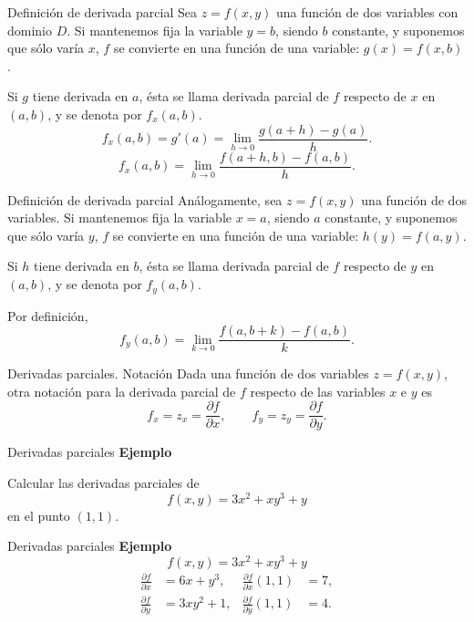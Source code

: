 \documentclass[original_version/main.tex]{subfiles}
\begin{document}
\graphicspath{{imagenes/tema3/}{../imagenes/tema3/}}

\begin{frame}{Definición de derivada parcial}
Sea $z=f(x,y)$ una función de dos variables con dominio $D$. Si mantenemos fija la variable $y=b$, siendo $b$ constante, y suponemos que sólo varía $x$, $f$ se convierte en una función de una variable: $g(x)=f(x,b)$.
\medskip

Si $g$ tiene derivada en $a$, ésta se llama derivada parcial de $f$ respecto de $x$ en $(a,b)$, y se denota por $f_x(a,b)$.
\[f_x(a,b)=g'(a)=\lim_{h\to0}\frac{g(a+h)-g(a)}h.\]
\[f_x(a,b)=\lim_{h\to0}\frac{f(a+h,b)-f(a,b)}h.\]
\end{frame}
\begin{frame}{Definición de derivada parcial}
Análogamente, sea $z=f(x,y)$ una función de dos variables. Si mantenemos fija la variable $x=a$, siendo $a$ constante, y suponemos que sólo varía $y$, $f$ se convierte en una función de una variable: $h(y)=f(a,y)$.
\medskip

Si $h$ tiene derivada en $b$, ésta se llama derivada parcial de $f$ respecto de $y$ en $(a,b)$, y se denota por $f_y(a,b)$.
\medskip

Por definición,
\[f_y(a,b)=\lim_{k\to0}\frac{f(a,b+k)-f(a,b)}k.\]
\end{frame}
\begin{frame}{Derivadas parciales. Notación}
Dada una función de dos variables $z=f(x,y)$, otra notación para la derivada parcial de $f$ respecto de las variables $x$ e $y$ es
\[f_x=z_x=\frac{\partial f}{\partial x},\qquad f_y=z_y=\frac{\partial f}{\partial y}.\]
\end{frame}
\begin{frame}{Derivadas parciales}
\textbf{Ejemplo}\par Calcular las derivadas parciales de\[f(x,y)=3x^2+xy^3+y\]
en el punto $(1,1)$.
\end{frame}
\begin{frame}{Derivadas parciales}
\textbf{Ejemplo}\[f(x,y)=3x^2+xy^3+y\]
\[\begin{aligned}
\frac{\partial f}{\partial x}&=6x+y^3,&\frac{\partial f}{\partial x}(1,1)&=7,\\[3mm]
\frac{\partial f}{\partial y}&=3xy^2+1,&\frac{\partial f}{\partial y}(1,1)&=4.
\end{aligned}\]
\end{frame}
\end{document}
